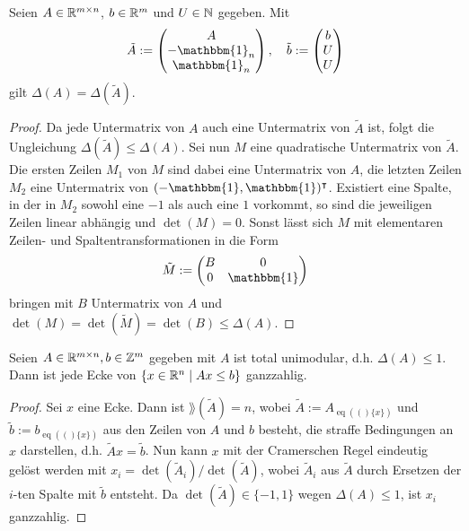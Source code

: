 \newcommand{\one}{\mathbbm{1}}
\newcommand{\eq}[1]{\operatorname{eq}(#1)}
\newcommand{\co}[1]{\operatorname{co}(#1)}

\begin{lemma}\label{lem:bounded}
	Seien $A\in\mathbb{R}^{m\times n}$, $b\in\mathbb{R}^m$ und $U\in\mathbb{N}$ gegeben.
	Mit $$
		\tilde{A}:=
		\begin{pmatrix} A \\ -\one_n \\ \one_n \end{pmatrix},\quad
		\tilde{b}:=\begin{pmatrix} b \\ U \\ U \end{pmatrix}
	$$
	gilt $\Delta(A)=\Delta(\tilde{A})$.
\end{lemma}
\begin{proof}
	Da jede Untermatrix von $A$ auch eine Untermatrix von $\tilde{A}$ ist, folgt die Ungleichung $\Delta(\tilde{A})\leq\Delta(A)$.
	Sei nun $M$ eine quadratische Untermatrix von $\tilde{A}$.
	Die ersten Zeilen $M_1$ von $M$ sind dabei eine Untermatrix von $A$, die letzten Zeilen $M_2$ eine Untermatrix von $(-\one, \one)\transpose$.
	Existiert eine Spalte, in der in $M_2$ sowohl eine $-1$ als auch eine $1$ vorkommt, so sind die jeweiligen Zeilen linear abhängig und $\det(M)=0$.
	Sonst lässt sich $M$ mit elementaren Zeilen- und Spaltentransformationen in die Form $$\tilde{M}:= \begin{pmatrix}
		B & 0 \\
		0 & \one
	\end{pmatrix}$$ bringen mit $B$ Untermatrix von $A$ und $\det(M)=\det(\tilde{M})=\det(B)\leq\Delta(A)$.
\end{proof}

\begin{lemma}\label{lem:unimodular}
	Seien $A\in\mathbb{R}^{m\times n},b\in\mathbb{Z}^m$ gegeben mit $A$ ist total unimodular, d.h. $\Delta(A)\leq 1$. Dann ist jede Ecke von $\{x\in\mathbb{R}^n \mid Ax\leq b \}$ ganzzahlig.
\end{lemma}
\begin{proof}
	Sei $x$ eine Ecke. Dann ist $\rang(\tilde{A})=n$, wobei $\tilde{A} := A_{\eq(\{x\})}$ und $\tilde{b}:=b_{\eq(\{x\})}$ aus den Zeilen von $A$ und $b$ besteht, die straffe Bedingungen an $x$ darstellen, d.h. $\tilde{A} x = \tilde{b}$.
	Nun kann $x$ mit der Cramerschen Regel eindeutig gelöst werden mit $x_i=\det(\tilde{A}_i)/\det(\tilde{A})$, wobei $\tilde{A}_i$ aus $\tilde{A}$ durch Ersetzen der $i$-ten Spalte mit $\tilde{b}$ entsteht.
	Da $\det(\tilde{A})\in\{-1,1\}$ wegen $\Delta(A)\leq 1$, ist $x_i$ ganzzahlig.
	
\end{proof}

